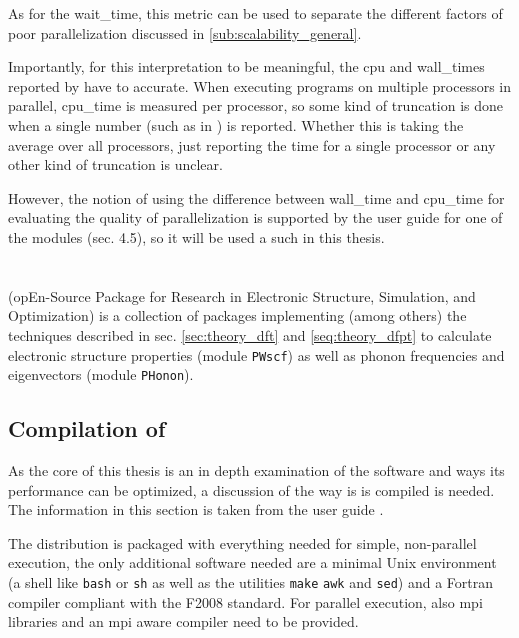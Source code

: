 \documentclass[main.tex]{subfiles}
\begin{document}
As for the \gls{wait_time}, this metric can be used to separate the different factors of poor parallelization discussed in \ref{sub:scalability_general}.

Importantly, for this interpretation to be meaningful, the cpu and \gls{wall_time}s reported by \QE have to accurate.
When executing programs on multiple processors in parallel, \gls{cpu_time} is measured per processor, so some kind of truncation is done when a single number (such as in \QE) is reported.
Whether this is taking the average over all processors, just reporting the time for a single processor or any other kind of truncation is unclear.

However, the notion of using the difference between \gls{wall_time} and \gls{cpu_time} for evaluating the quality of parallelization is supported by the user guide for one of the \QE modules \cite{noauthor_pwscf_nodate} (sec. 4.5), so it will be used a such in this thesis.

\section{\QE}\label{sec:qe}

\QE (opEn-Source Package for Research in Electronic Structure, Simulation, and Optimization) \cite{giannozzi_quantum_2009,giannozzi_advanced_2017} is a collection of packages implementing (among others) the techniques described in sec. \ref{sec:theory_dft} and \ref{seq:theory_dfpt} to calculate electronic structure properties (module \texttt{PWscf}) as well as phonon frequencies and eigenvectors (module \texttt{PHonon}).

\subsection{Compilation of \QE}\label{sub:qe_compilation}

As the core of this thesis is an in depth examination of the \QE software and ways its performance can be optimized, a discussion of the way is is compiled is needed.
The information in this section is taken from the  user guide \cite{noauthor_quantum_nodate}.

The \QE distribution is packaged with everything needed for simple, non-parallel execution, the only additional software needed are a minimal Unix environment (a shell like \texttt{bash} or \texttt{sh} as well as the utilities \texttt{make} \texttt{awk} and \texttt{sed}) and a Fortran compiler compliant with the F2008 standard.
For parallel execution, also \gls{mpi} libraries and an \gls{mpi} aware compiler need to be provided.
\end{document}

